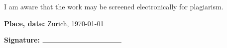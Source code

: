 \documentclass[a4paper,11pt,titlepage]{article}
\begin{document}
I am aware that the work may be screened electronically for plagiarism. \\
\vspace{0.5cm}

\begin{center}
    \textbf{Place, date:}      Zurich, \today\\
\end{center}
\vspace{0.01cm}
\begin{center}
\textbf{Signature: }$\rule{4cm}{0.15mm}$\\
\end{center}


%







\newpage
\tableofcontents
\thispagestyle{empty}

\newpage



\vspace*{10pt}
\end{document}
